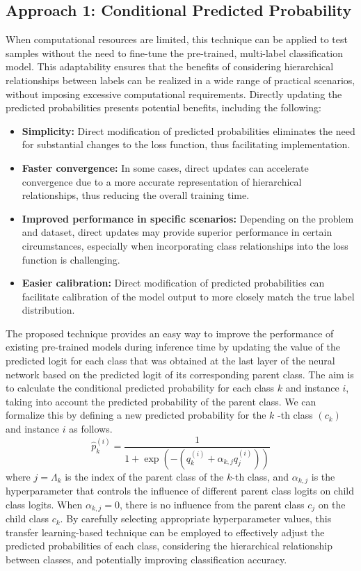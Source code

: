\subsection{Approach 1: Conditional Predicted Probability}\label{subsec:taxonomy.method.approach1}
When computational resources are limited, this technique can be applied to test samples without the need to fine-tune the pre-trained, multi-label classification model. This adaptability ensures that the benefits of considering hierarchical relationships between labels can be realized in a wide range of practical scenarios, without imposing excessive computational requirements.
Directly updating the predicted probabilities presents potential benefits, including the following:
\begin{itemize}
    \item  \textbf{Simplicity:} Direct modification of predicted probabilities eliminates the need for substantial changes to the loss function, thus facilitating implementation.
    \item  \textbf{Faster convergence:} In some cases, direct updates can accelerate convergence due to a more accurate representation of hierarchical relationships, thus reducing the overall training time.
    \item  \textbf{Improved performance in specific scenarios:} Depending on the problem and dataset, direct updates may provide superior performance in certain circumstances, especially when incorporating class relationships into the loss function is challenging.
    \item  \textbf{Easier calibration:} Direct modification of predicted probabilities can facilitate calibration of the model output to more closely match the true label distribution.
\end{itemize}
The proposed technique provides an easy way to improve the performance of existing pre-trained models during inference time by updating the value of the predicted logit for each class that was obtained at the last layer of the neural network based on the predicted logit of its corresponding parent class. The aim is to calculate the conditional predicted probability for each class $k $ and instance $i $, taking into account the predicted probability of the parent class. We can formalize this by defining a new predicted probability for the $k $ -th class $(c_k) $ and instance $i $ as follows.
\begin{equation}
    \widehat{p}_k^{(i)} = \frac{1}{ 1 + \exp \left(-\left(q_k^{(i)} + \alpha_{k,j} q_j^{(i)} \right)\right) }
    \label{eq:taxonomy.eq.1.pred.approach1}
\end{equation}
where $j=\Lambda_k$ is the index of the parent class of the $k$-th class, and $\alpha_{k,j} $ is the hyperparameter that controls the influence of different parent class logits on child class logits.
When $\alpha_{k,j}=0 $, there is no influence from the parent class $c_j$ on the child class $c_k$.  By carefully selecting appropriate hyperparameter values, this transfer learning-based technique can be employed to effectively adjust the predicted probabilities of each class, considering the hierarchical relationship between classes, and potentially improving classification accuracy.
